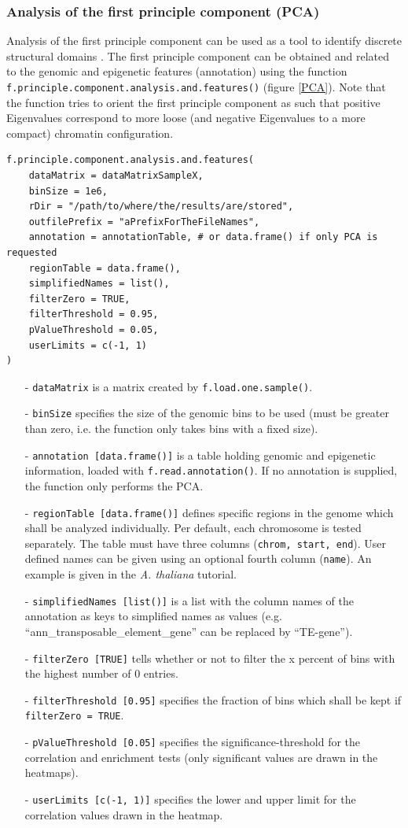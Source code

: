 \documentclass[a4paper,10pt]{article}
\begin{document}
\subsubsection{Analysis of the first principle component (PCA)}
Analysis of the first principle component can be used as a tool to identify discrete structural domains \cite{2009_LiebermanAiden}. The first principle component can be obtained and related to the genomic and epigenetic features (annotation) using the function \texttt{f.principle.component.analysis.and.features()} (figure \ref{PCA}). Note that the function tries to orient the first principle component as such that positive Eigenvalues correspond to more loose (and negative Eigenvalues to a more compact) chromatin configuration.
\begin{verbatim}
f.principle.component.analysis.and.features(
    dataMatrix = dataMatrixSampleX,
    binSize = 1e6,
    rDir = "/path/to/where/the/results/are/stored",
    outfilePrefix = "aPrefixForTheFileNames",
    annotation = annotationTable, # or data.frame() if only PCA is requested
    regionTable = data.frame(),
    simplifiedNames = list(),
    filterZero = TRUE,
    filterThreshold = 0.95,
    pValueThreshold = 0.05,
    userLimits = c(-1, 1)
)
\end{verbatim}
\begin{itemize}
 \item[-] \texttt{dataMatrix} is a matrix created by \texttt{f.load.one.sample()}.
 \item[-] \texttt{binSize} specifies the size of the genomic bins to be used (must be greater than zero, i.e. the function only takes bins with a fixed size).
 \item[-] \texttt{annotation [data.frame()]} is a table holding genomic and epigenetic information, loaded with \texttt{f.read.annotation()}. If no annotation is supplied, the function only performs the PCA.
 \item[-] \texttt{regionTable [data.frame()]} defines specific regions in the genome which shall be analyzed individually. Per default, each chromosome is tested separately. The table must have three columns (\texttt{chrom, start, end}). User defined names can be given using an optional fourth column (\texttt{name}). An example is given in the \textit{A. thaliana} tutorial.
 \item[-] \texttt{simplifiedNames [list()]} is a list with the column names of the annotation as keys to simplified names as values (e.g. ``ann\_transposable\_element\_gene'' can be replaced by ``TE-gene'').
 \item[-] \texttt{filterZero [TRUE]} tells whether or not to filter the x percent of bins with the highest number of 0 entries.
 \item[-] \texttt{filterThreshold [0.95]} specifies the fraction of bins which shall be kept if \texttt{filterZero = TRUE}.
 \item[-] \texttt{pValueThreshold [0.05]} specifies the significance-threshold for the correlation and enrichment tests (only significant values are drawn in the heatmaps).
 \item[-] \texttt{userLimits [c(-1, 1)]} specifies the lower and upper limit for the correlation values drawn in the heatmap.
\end{itemize}
\end{document}
